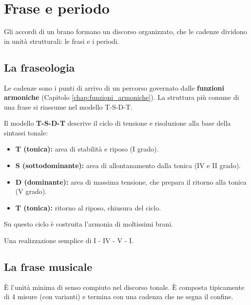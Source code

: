 \chapter{Frase e periodo}
\label{chap:struttura_frase}

Gli accordi di un brano formano un discorso organizzato, che le cadenze dividono in unità strutturali: le frasi e i periodi.

\section{La fraseologia}
\label{sec:fraseologia}

Le cadenze sono i punti di arrivo di un percorso governato dalle \textbf{funzioni armoniche} (Capitolo \ref{chap:funzioni_armoniche}). La struttura più comune di una frase si riassume nel modello T-S-D-T.

\begin{regola}
	\label{reg:tsdt}
	Il modello \textbf{T-S-D-T} descrive il ciclo di tensione e risoluzione alla base della sintassi tonale:
	\begin{itemize}
		\item \textbf{T (tonica):} area di stabilità e riposo (I grado).
		\item \textbf{S (sottodominante):} area di allontanamento dalla tonica (IV e II grado).
		\item \textbf{D (dominante):} area di massima tensione, che prepara il ritorno alla tonica (V grado).
		\item \textbf{T (tonica):} ritorno al riposo, chiusura del ciclo.
	\end{itemize}
	Su questo ciclo è costruita l'armonia di moltissimi brani.
\end{regola}

\begin{esempio}
	\label{ex:tsdt}
	Una realizzazione semplice di I - IV - V - I.
\end{esempio}

\section{La frase musicale}
\label{sec:frase_musicale}

\begin{definizione}
    È l'unità minima di senso compiuto nel discorso tonale. È composta tipicamente di 4 misure (con varianti) e termina con una cadenza che ne segna il confine.
\end{definizione}

